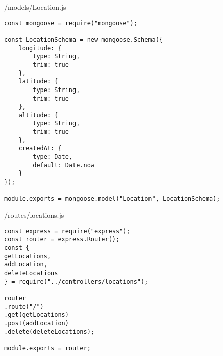 /models/Location.js
\begin{lstlisting}
const mongoose = require("mongoose");

const LocationSchema = new mongoose.Schema({
	longitude: {
		type: String,
		trim: true
	},
	latitude: {
		type: String,
		trim: true
	},
	altitude: {
		type: String,
		trim: true
	},
	createdAt: {
		type: Date,
		default: Date.now
	}
});

module.exports = mongoose.model("Location", LocationSchema);
\end{lstlisting}
/routes/locations.js
\begin{lstlisting}
const express = require("express");
const router = express.Router();
const {
getLocations,
addLocation,
deleteLocations
} = require("../controllers/locations");

router
.route("/")
.get(getLocations)
.post(addLocation)
.delete(deleteLocations);

module.exports = router;
\end{lstlisting}